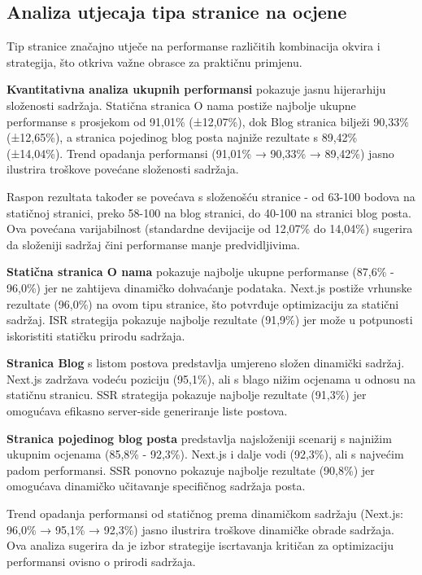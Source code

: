 \subsection{Analiza utjecaja tipa stranice na ocjene}

Tip stranice značajno utječe na performanse različitih kombinacija okvira i strategija, što otkriva važne obrasce za praktičnu primjenu.

\textbf{Kvantitativna analiza ukupnih performansi} pokazuje jasnu hijerarhiju složenosti sadržaja. Statična stranica O nama postiže najbolje ukupne performanse s prosjekom od 91,01\% (±12,07\%), dok Blog stranica bilježi 90,33\% (±12,65\%), a stranica pojedinog blog posta najniže rezultate s 89,42\% (±14,04\%). Trend opadanja performansi (91,01\% → 90,33\% → 89,42\%) jasno ilustrira troškove povećane složenosti sadržaja.

Raspon rezultata također se povećava s složenošću stranice - od 63-100 bodova na statičnoj stranici, preko 58-100 na blog stranici, do 40-100 na stranici blog posta. Ova povećana varijabilnost (standardne devijacije od 12,07\% do 14,04\%) sugerira da složeniji sadržaj čini performanse manje predvidljivima.

\textbf{Statična stranica O nama} pokazuje najbolje ukupne performanse (87,6\% - 96,0\%) jer ne zahtijeva dinamičko dohvaćanje podataka. Next.js postiže vrhunske rezultate (96,0\%) na ovom tipu stranice, što potvrđuje optimizaciju za statični sadržaj. ISR strategija pokazuje najbolje rezultate (91,9\%) jer može u potpunosti iskoristiti statičku prirodu sadržaja.

\textbf{Stranica Blog} s listom postova predstavlja umjereno složen dinamički sadržaj. Next.js zadržava vodeću poziciju (95,1\%), ali s blago nižim ocjenama u odnosu na statičnu stranicu. SSR strategija pokazuje najbolje rezultate (91,3\%) jer omogućava efikasno server-side generiranje liste postova.

\textbf{Stranica pojedinog blog posta} predstavlja najsloženiji scenarij s najnižim ukupnim ocjenama (85,8\% - 92,3\%). Next.js i dalje vodi (92,3\%), ali s najvećim padom performansi. SSR ponovno pokazuje najbolje rezultate (90,8\%) jer omogućava dinamičko učitavanje specifičnog sadržaja posta.

Trend opadanja performansi od statičnog prema dinamičkom sadržaju (Next.js: 96,0\% → 95,1\% → 92,3\%) jasno ilustrira troškove dinamičke obrade sadržaja. Ova analiza sugerira da je izbor strategije iscrtavanja kritičan za optimizaciju performansi ovisno o prirodi sadržaja.

